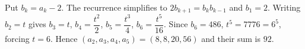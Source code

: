 Put $b_k=a_k-2$. The recurrence simplifies to $2b_{k+1}=b_kb_{k-1}$ and $b_1=2$. Writing $b_2=t$ gives $b_3=t$, $b_4=\dfrac{t^2}{2}$, $b_5=\dfrac{t^3}{4}$, $b_6=\dfrac{t^5}{16}$. Since $b_6=486$, $t^5=7776=6^5$, forcing $t=6$. Hence $(a_2,a_3,a_4,a_5)=(8,8,20,56)$ and their sum is $\boxed{92}$.
